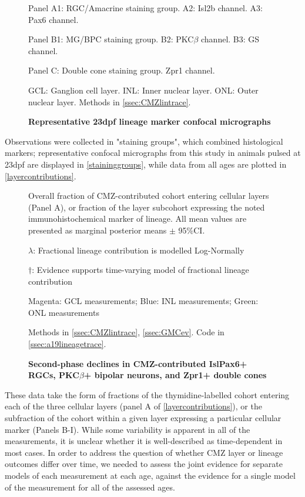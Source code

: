 \begin{figure}[!h]
    \caption{{\bf Representative 23dpf lineage marker confocal micrographs}}
    Panel A1: RGC/Amacrine staining group. A2: Isl2b channel. A3: Pax6 channel.

    Panel B1: MG/BPC staining group. B2: PKC$\beta$ channel. B3: GS channel.

    Panel C: Double cone staining group. Zpr1 channel.

    GCL: Ganglion cell layer. INL: Inner nuclear layer. ONL: Outer nuclear layer.
    Methods in \autoref{ssec:CMZlintrace}.
    \label{staininggroups}
\end{figure}

Observations were collected in "staining groups", which combined histological markers; representative confocal micrographs from this study in animals pulsed at 23dpf are displayed in \autoref{staininggroups}, while data from all ages are plotted in \autoref{layercontributions}.

\begin{figure}[!h]
    \caption{{\bf Second-phase declines in CMZ-contributed Isl\/Pax6+ RGCs, PKC$\beta$+ bipolar neurons, and Zpr1+ double cones}}
    Overall fraction of CMZ-contributed cohort entering cellular layers (Panel A), or fraction of the layer subcohort expressing the noted immunohistochemical marker of lineage. All mean values are presented as marginal posterior means $\pm$ 95\%CI.

    $\lambda$: Fractional lineage contribution is modelled Log-Normally

    $\dagger$: Evidence supports time-varying model of fractional lineage contribution

    Magenta: GCL measurements; Blue: INL measurements; Green: ONL measurements

    Methods in \autoref{ssec:CMZlintrace}, \autoref{ssec:GMCev}.
    Code in \autoref{ssec:a19lineagetrace}.    
    \label{layercontributions}
\end{figure}

These data take the form of fractions of the thymidine-labelled cohort entering each of the three cellular layers (panel A of \autoref{layercontributions}), or the subfraction of the cohort within a given layer expressing a particular cellular marker (Panels B-I). While some variability is apparent in all of the measurements, it is unclear whether it is well-described as time-dependent in most cases. In order to address the question of whether CMZ layer or lineage outcomes differ over time, we needed to assess the joint evidence for separate models of each measurement at each age, against the evidence for a single model of the measurement for all of the assessed ages. 

